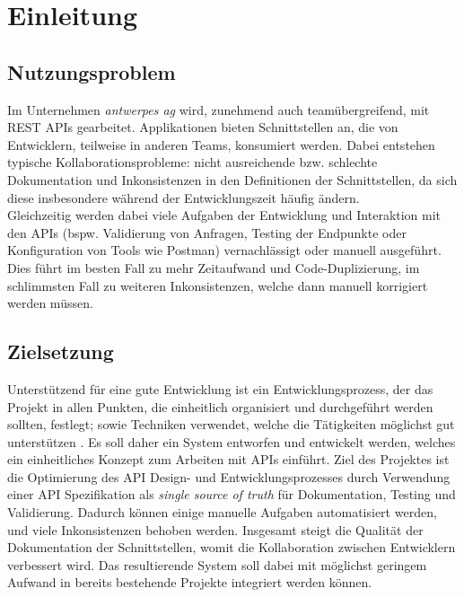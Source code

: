 
\section{Einleitung}

\subsection{Nutzungsproblem}

Im Unternehmen \emph{antwerpes ag} wird, zunehmend auch teamübergreifend, mit REST APIs gearbeitet. Applikationen bieten Schnittstellen an, die von Entwicklern, teilweise in anderen Teams, konsumiert werden. Dabei entstehen typische Kollaborationsprobleme: nicht ausreichende bzw. schlechte Dokumentation und Inkonsistenzen in den Definitionen der Schnittstellen, da sich diese insbesondere während der Entwicklungszeit häufig ändern.\\
Gleichzeitig werden dabei viele Aufgaben der Entwicklung und Interaktion mit den APIs (bspw. Validierung von Anfragen, Testing der Endpunkte oder Konfiguration von Tools wie Postman) vernachlässigt oder manuell ausgeführt.\\
Dies führt im besten Fall zu mehr Zeitaufwand und Code-Duplizierung, im schlimmsten Fall zu weiteren Inkonsistenzen, welche dann manuell korrigiert werden müssen.

\subsection{Zielsetzung}

Unterstützend für eine gute Entwicklung ist ein Entwicklungsprozess, der das Projekt in allen Punkten, die einheitlich organisiert und durchgeführt werden sollten, festlegt; sowie Techniken verwendet, welche die Tätigkeiten möglichst gut unterstützen \cite{ludewig2007software}. Es soll daher ein System entworfen und entwickelt werden, welches ein einheitliches Konzept zum Arbeiten mit APIs einführt. Ziel des Projektes ist die Optimierung des API Design- und Entwicklungsprozesses durch Verwendung einer API Spezifikation als \emph{single source of truth} für Dokumentation, Testing und Validierung. Dadurch können einige manuelle Aufgaben automatisiert werden, und viele Inkonsistenzen behoben werden. Insgesamt steigt die Qualität der Dokumentation der Schnittstellen, womit die Kollaboration zwischen Entwicklern verbessert wird. Das resultierende System soll dabei mit möglichst geringem Aufwand in bereits bestehende Projekte integriert werden können. \\
 